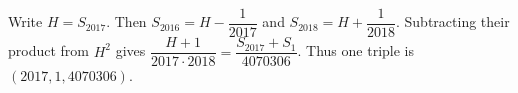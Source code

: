 Write $H=S_{2017}$. Then $S_{2016}=H-\dfrac{1}{2017}$ and $S_{2018}=H+\dfrac{1}{2018}$. Subtracting their product from $H^2$ gives $\dfrac{H+1}{2017\cdot2018}=\dfrac{S_{2017}+S_1}{4070306}$. Thus one triple is $\boxed{(2017,1,4070306)}$.
